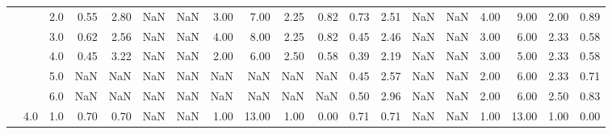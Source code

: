 \begin{tabular}{lllrrrrrrrrrrrrrrrr}
      &     & 2.0  &      0.55 &       2.80 &               NaN &                NaN & 3.00 &   7.00 &             2.25 &                         0.82 &      0.73 &       2.51 &               NaN &                NaN & 4.00 &   9.00 &             2.00 &                         0.89 \\
      &     & 3.0  &      0.62 &       2.56 &               NaN &                NaN & 4.00 &   8.00 &             2.25 &                         0.82 &      0.45 &       2.46 &               NaN &                NaN & 3.00 &   6.00 &             2.33 &                         0.58 \\
      &     & 4.0  &      0.45 &       3.22 &               NaN &                NaN & 2.00 &   6.00 &             2.50 &                         0.58 &      0.39 &       2.19 &               NaN &                NaN & 3.00 &   5.00 &             2.33 &                         0.58 \\
      &     & 5.0  &       NaN &        NaN &               NaN &                NaN &  NaN &    NaN &              NaN &                          NaN &      0.45 &       2.57 &               NaN &                NaN & 2.00 &   6.00 &             2.33 &                         0.71 \\
      &     & 6.0  &       NaN &        NaN &               NaN &                NaN &  NaN &    NaN &              NaN &                          NaN &      0.50 &       2.96 &               NaN &                NaN & 2.00 &   6.00 &             2.50 &                         0.83 \\
      & 4.0 & 1.0  &      0.70 &       0.70 &               NaN &                NaN & 1.00 &  13.00 &             1.00 &                         0.00 &      0.71 &       0.71 &               NaN &                NaN & 1.00 &  13.00 &             1.00 &                         0.00 \\
\bottomrule
\end{tabular}
